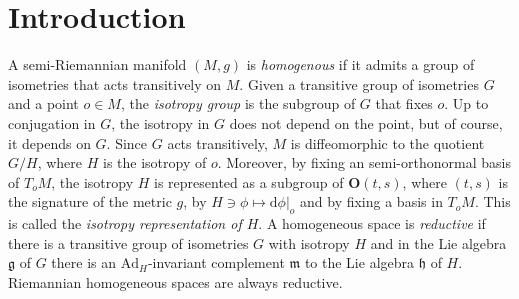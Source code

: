 \documentclass[11pt,a4paper]{amsart}
\newcommand{\g}{\mathfrak{g}}
\newcommand{\h}{\mathfrak{h}}
\newcommand{\m}{\mathfrak{m}}
\newcommand{\+}{\oplus}
\renewcommand{\O}{\mathbf{O}}
\newcommand{\1}{\mathbf{1}}
\renewcommand{\d}{\mathrm{d}}
\newcommand{\<}{\langle}
\renewcommand{\>}{\rangle}
\theoremstyle{definition}
\theoremstyle{plain}
\numberwithin{equation}{section}
\begin{document}
\maketitle



\section{Introduction}
A semi-Riemannian manifold $(M,g)$ is {\em homogenous} if it admits a group of isometries that acts transitively on $M$. Given a transitive group of isometries $G$ and a point  $o\in M$, the {\em isotropy group} is the subgroup of $G$ that fixes $o$. Up to conjugation in $G$, the isotropy in $G$ does not depend on the point, but of course, it depends on  $G$. 
Since $G$ acts transitively, $M$ is diffeomorphic to the quotient $G/H$, where $H$ is the isotropy of $o$.  Moreover, by fixing an semi-orthonormal  basis of $T_oM$, the isotropy $H$ is represented as a subgroup of $\O(t,s)$, where $(t,s)$ is the signature of the metric $g$, by $H\ni \phi\mapsto \d \phi|_o$ and by fixing a basis in $T_oM$.  This is called the {\em isotropy representation of $H$}.
A homogeneous space is {\em reductive} if there is a transitive group of isometries $G$ with isotropy $H$ and in the Lie algebra $\g$ of $G$ there is an $\mathrm{Ad}_H$-invariant complement $\m$ to the Lie algebra $\h$ of $H$. Riemannian homogeneous spaces are always reductive.
\end{document}
